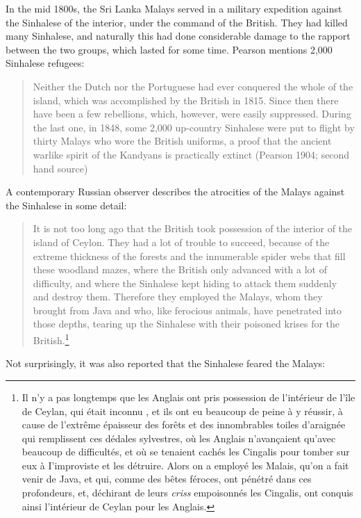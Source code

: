 In the mid 1800s, the Sri Lanka Malays served in a military expedition against the Sinhalese of the interior, under the command of the British. They had killed many Sinhalese, and naturally this had done considerable damage to the rapport between the two groups, which lasted for some time. Pearson mentions 2,000 Sinhalese refugees: 

\begin{quote}
Neither the Dutch nor the Portuguese had ever conquered the whole of the island, which was accomplished by the British in 1815. Since then there have been a few rebellions, which, however, were easily suppressed. During the last one, in 1848, some 2,000 up-country Sinhalese were put to flight by thirty Malays who wore the British uniforms, a proof that the ancient warlike spirit of the Kandyans is practically extinct (Pearson 1904; second hand source)
\end{quote}

A contemporary Russian observer describes the atrocities of the Malays against the Sinhalese in some detail: 

\begin{quote}
It is not too long ago that the British took possession of the interior of the island of Ceylon. They had a lot of trouble to succeed, because of the extreme thickness of the forests and the innumerable spider webs that fill these woodland mazes, where the British only advanced with a lot of difficulty, and where the Sinhalese kept hiding to attack them suddenly and destroy them. Therefore they employed the Malays, whom they brought from Java and who, like ferocious animals, have penetrated into those depths, tearing up the Sinhalese with their poisoned krises for the British.\footnote{Il 
 n'y a pas longtemps que les Anglais ont pris possession de l'intérieur de l'île de Ceylan, qui était inconnu , et ils ont eu beaucoup de peine à y réussir, à cause de l'extrême épaisseur des forêts et des innombrables toiles d'araignée qui remplissent ces dédales sylvestres, où les Anglais n'avan\c{c}aient qu'avec beaucoup de difficultés, et où se tenaient cachés les Cingalis pour tomber sur eux à I'improviste et les détruire. Alors on a employé les Malais, qu'on a fait venir de Java, et qui, comme des bêtes féroces, ont pénétré dans ces profondeurs, et, déchirant de leurs \textit{criss} empoisonnés les Cingalis, ont conquis ainsi l'intérieur de Ceylan pour les Anglais.
} 
\citep[27-28]{Soltykoff1853}
\end{quote}

Not surprisingly, it was also reported that the Sinhalese feared the Malays:


